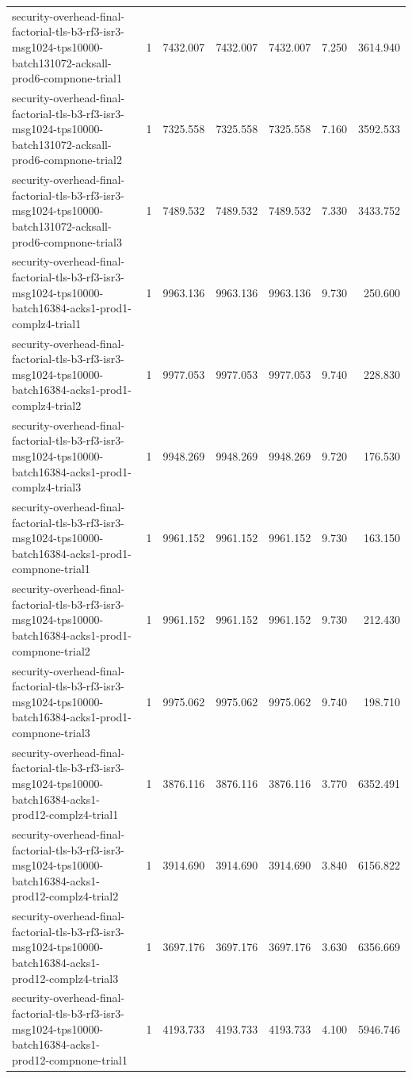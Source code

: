 \begin{tabular}{lrrrrrr}
security-overhead-final-factorial-tls-b3-rf3-isr3-msg1024-tps10000-batch131072-acksall-prod6-compnone-trial1 & 1 & 7432.007 & 7432.007 & 7432.007 & 7.250 & 3614.940 \\
security-overhead-final-factorial-tls-b3-rf3-isr3-msg1024-tps10000-batch131072-acksall-prod6-compnone-trial2 & 1 & 7325.558 & 7325.558 & 7325.558 & 7.160 & 3592.533 \\
security-overhead-final-factorial-tls-b3-rf3-isr3-msg1024-tps10000-batch131072-acksall-prod6-compnone-trial3 & 1 & 7489.532 & 7489.532 & 7489.532 & 7.330 & 3433.752 \\
security-overhead-final-factorial-tls-b3-rf3-isr3-msg1024-tps10000-batch16384-acks1-prod1-complz4-trial1 & 1 & 9963.136 & 9963.136 & 9963.136 & 9.730 & 250.600 \\
security-overhead-final-factorial-tls-b3-rf3-isr3-msg1024-tps10000-batch16384-acks1-prod1-complz4-trial2 & 1 & 9977.053 & 9977.053 & 9977.053 & 9.740 & 228.830 \\
security-overhead-final-factorial-tls-b3-rf3-isr3-msg1024-tps10000-batch16384-acks1-prod1-complz4-trial3 & 1 & 9948.269 & 9948.269 & 9948.269 & 9.720 & 176.530 \\
security-overhead-final-factorial-tls-b3-rf3-isr3-msg1024-tps10000-batch16384-acks1-prod1-compnone-trial1 & 1 & 9961.152 & 9961.152 & 9961.152 & 9.730 & 163.150 \\
security-overhead-final-factorial-tls-b3-rf3-isr3-msg1024-tps10000-batch16384-acks1-prod1-compnone-trial2 & 1 & 9961.152 & 9961.152 & 9961.152 & 9.730 & 212.430 \\
security-overhead-final-factorial-tls-b3-rf3-isr3-msg1024-tps10000-batch16384-acks1-prod1-compnone-trial3 & 1 & 9975.062 & 9975.062 & 9975.062 & 9.740 & 198.710 \\
security-overhead-final-factorial-tls-b3-rf3-isr3-msg1024-tps10000-batch16384-acks1-prod12-complz4-trial1 & 1 & 3876.116 & 3876.116 & 3876.116 & 3.770 & 6352.491 \\
security-overhead-final-factorial-tls-b3-rf3-isr3-msg1024-tps10000-batch16384-acks1-prod12-complz4-trial2 & 1 & 3914.690 & 3914.690 & 3914.690 & 3.840 & 6156.822 \\
security-overhead-final-factorial-tls-b3-rf3-isr3-msg1024-tps10000-batch16384-acks1-prod12-complz4-trial3 & 1 & 3697.176 & 3697.176 & 3697.176 & 3.630 & 6356.669 \\
security-overhead-final-factorial-tls-b3-rf3-isr3-msg1024-tps10000-batch16384-acks1-prod12-compnone-trial1 & 1 & 4193.733 & 4193.733 & 4193.733 & 4.100 & 5946.746 \\

\end{tabular}
